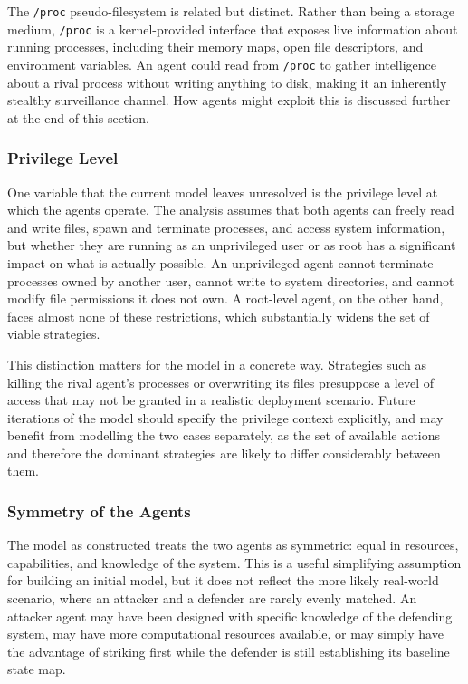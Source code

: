 The \texttt{/proc} pseudo-filesystem is related but distinct. Rather than being a storage medium, \texttt{/proc} is a kernel-provided interface that exposes live information about running processes, including their memory maps, open file descriptors, and environment variables. An agent could read from \texttt{/proc} to gather intelligence about a rival process without writing anything to disk, making it an inherently stealthy surveillance channel. How agents might exploit this is discussed further at the end of this section.

\subsubsection{Privilege Level}
\label{PrivilegeLevel}

One variable that the current model leaves unresolved is the privilege level at which the agents operate. The analysis assumes that both agents can freely read and write files, spawn and terminate processes, and access system information, but whether they are running as an unprivileged user or as root has a significant impact on what is actually possible. An unprivileged agent cannot terminate processes owned by another user, cannot write to system directories, and cannot modify file permissions it does not own. A root-level agent, on the other hand, faces almost none of these restrictions, which substantially widens the set of viable strategies.

This distinction matters for the model in a concrete way. Strategies such as killing the rival agent's processes or overwriting its files presuppose a level of access that may not be granted in a realistic deployment scenario. Future iterations of the model should specify the privilege context explicitly, and may benefit from modelling the two cases separately, as the set of available actions and therefore the dominant strategies are likely to differ considerably between them.

\subsubsection{Symmetry of the Agents}
\label{AgentSymmetry}

The model as constructed treats the two agents as symmetric: equal in resources, capabilities, and knowledge of the system. This is a useful simplifying assumption for building an initial model, but it does not reflect the more likely real-world scenario, where an attacker and a defender are rarely evenly matched. An attacker agent may have been designed with specific knowledge of the defending system, may have more computational resources available, or may simply have the advantage of striking first while the defender is still establishing its baseline state map.

